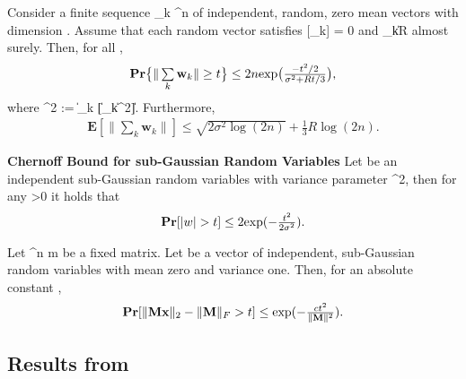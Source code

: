 \documentclass{article}
\def\[#1\]{{$#1$}}
\def\b#1{{\mathbf{#1}}}
\begin{document}
\begin{lemma} \label{vector_bernstein}
	Consider a finite sequence {\[\b{w}_k \in {}^{n} \]} of independent, random, zero mean vectors with dimension \[n\]. Assume that each random vector satisfies \[\b{E}[\b{w}_k] = 0\] and \[\|\b{w}_k\| \leq R\] almost surely. Then, for all \[t\],
	\begin{align*}
	\b{Pr}\big\{ \|\textstyle\sum\limits_{k} \b{w}_k\| \geq t\big\} \leq 2n {\rm exp}\big( \tfrac{-t^2/2}{\sigma^2 + Rt/3}\big),
	\end{align*}
	where \[\sigma^2 := \|\textstyle\sum\limits_{k} \b{E}[\|\b{w}_k\|^2]\|\]. 
	Furthermore,
	\begin{align*}
	\b{E}[\|\textstyle\sum\limits_{k} \b{w}_k\|] \leq \sqrt{2 \sigma^2 \log(2n)} + \tfrac{1}{3}R\log(2n).
	\end{align*}
	
\end{lemma}




\begin{lemma}\textbf{Chernoff Bound for sub-Gaussian Random Variables} \label{theorem:subg_chern} 
	Let \[w\] be an independent sub-Gaussian random variables with variance parameter \[\sigma^2\], then for any \[t>0\] it holds that
	\begin{align*}
	\b{Pr}[|w|>t] \leq 2{\rm exp}(-\tfrac{t^2}{2\sigma^2}).
	\end{align*}
	
\end{lemma}




\begin{lemma}\label{thm:Hanson}
	Let \[\b{M} \in {}^{n \times m}\] be a fixed matrix. Let \[\b{w}\] be a vector of independent, sub-Gaussian random variables with mean zero and variance one. Then, for an absolute constant \[c\],
	\begin{align*}
	\b{Pr}[\|\b{M}\b{x}\|_2 - \|\b{M}\|_F> t] \leq {\rm exp}(-\tfrac{ct^2}{\|\b{M}\|^2}).
	\end{align*}
	 
	
\end{lemma} 


\subsection{Results from \citep{Arora15}}
\end{document}
